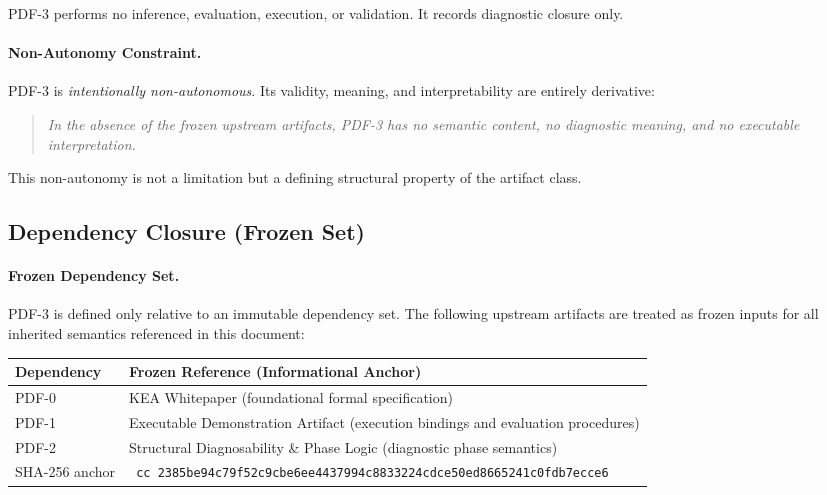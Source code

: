 PDF-3 performs no inference, evaluation, execution, or validation.
It records diagnostic closure only.

\paragraph{Non-Autonomy Constraint.}
PDF-3 is \emph{intentionally non-autonomous}.
Its validity, meaning, and interpretability are entirely derivative:
\begin{quote}
\emph{In the absence of the frozen upstream artifacts,
PDF-3 has no semantic content, no diagnostic meaning,
and no executable interpretation.}
\end{quote}
This non-autonomy is not a limitation but a defining structural property
of the artifact class.

\subsection{Dependency Closure (Frozen Set)}

\paragraph{Frozen Dependency Set.}
PDF-3 is defined only relative to an immutable dependency set.
The following upstream artifacts are treated as frozen inputs
for all inherited semantics referenced in this document:

\newcommand{\shaBreak}[1]{\texttt{\expandafter\shaBreakAux#1\relax}}
\def\shaBreakAux#1{%
  \ifx#1\relax\else #1\allowbreak\expandafter\shaBreakAux\fi
}

\begin{center}
\begin{tabular}{|l|p{9.8cm}|}
\hline
\textbf{Dependency} & \textbf{Frozen Reference (Informational Anchor)} \\
\hline
PDF-0 & KEA Whitepaper (foundational formal specification) \\
\hline
PDF-1 & Executable Demonstration Artifact (execution bindings and evaluation procedures) \\
\hline
PDF-2 & Structural Diagnosability \& Phase Logic (diagnostic phase semantics) \\
\hline
SHA-256 anchor & \shaBreak{c2385be94c79f52c9cbe6ee4437994c8833224cdce50ed8665241c0fdb7ecce6} \\
\hline
\end{tabular}
\end{center}

